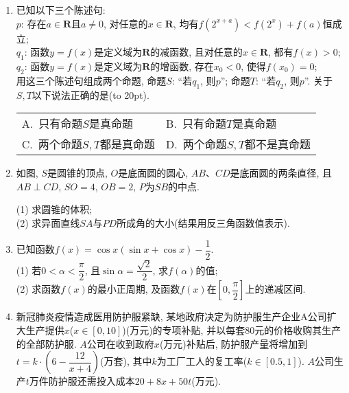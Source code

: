 \documentclass[10pt,a4paper]{article}
\newcommand{\bracket}[1]{(\hbox to #1pt{})}
\newcommand{\twoch}[4]{\par\begin{tabular}{p{.46\textwidth}p{.46\textwidth}}
A.~#1& B.~#2\\
C.~#3& D.~#4
\end{tabular}}
\begin{document}
\begin{enumerate}[1.]
\twoch{$t=\dfrac 12$, $s$的最小值为$\dfrac{\pi}6$}{$t=\dfrac{\sqrt 3}2$, $s$的最小值为$\dfrac{\pi}6$}{$t=\dfrac 12$, $s$的最小值为$\dfrac{\pi}3$}{$t=\dfrac{\sqrt 3}2$, $s$的最小值为$\dfrac{\pi}3$}\item 已知以下三个陈述句:\\
$p$: 存在$a\in \mathbf{R}$且$a\ne 0$, 对任意的$x\in \mathbf{R}$, 均有$f(2^{x+a})<f(2^x)+f(a)$恒成立;\\
$q_1$: 函数$y=f(x)$是定义域为$\mathbf{R}$的减函数, 且对任意的$x\in \mathbf{R}$, 都有$f(x)>0$;\\
$q_2$: 函数$y=f(x)$是定义域为$\mathbf{R}$的增函数, 存在$x_0<0$, 使得$f(x_0)=0$;\\
用这三个陈述句组成两个命题, 命题$S$: ``若$q_1$, 则$p$''; 命题$T$: ``若$q_2$, 则$p$''. 关于$S,T$以下说法正确的是\bracket{20}.
\twoch{只有命题$S$是真命题}{只有命题$T$是真命题}{两个命题$S,T$都是真命题}{两个命题$S,T$都不是真命题}
\item 如图, $S$是圆锥的顶点, $O$是底面圆的圆心, $AB$、$CD$是底面圆的两条直径, 且$AB\perp CD$, $SO=4$, $OB=2$, $P$为$SB$的中点.
\begin{center}
\end{center}
(1) 求圆锥的体积;\\
(2) 求异面直线$SA$与$PD$所成角的大小(结果用反三角函数值表示).
\item 已知函数$f(x)=\cos x(\sin x+\cos x)-\dfrac 12$.\\
(1) 若$0<\alpha <\dfrac{\pi}2$, 且$\sin \alpha =\dfrac{\sqrt 2}2$, 求$f(\alpha)$的值;\\
(2) 求函数$f(x)$的最小正周期, 及函数$f(x)$在$[0,\dfrac\pi 2]$上的递减区间.
\item 新冠肺炎疫情造成医用防护服紧缺, 某地政府决定为防护服生产企业A公司扩大生产提供$x$($x\in [0,10]$)(万元)的专项补贴, 并以每套$80$元的价格收购其生产的全部防护服. $A$公司在收到政府$x$(万元)补贴后, 防护服产量将增加到$t=k\cdot (6-\dfrac{12}{x+4})$(万套), 其中$k$为工厂工人的复工率($k\in [0.5,1]$). $A$公司生产$t$万件防护服还需投入成本$20+8x+50t$(万元).\\

\end{enumerate}
\end{document}
